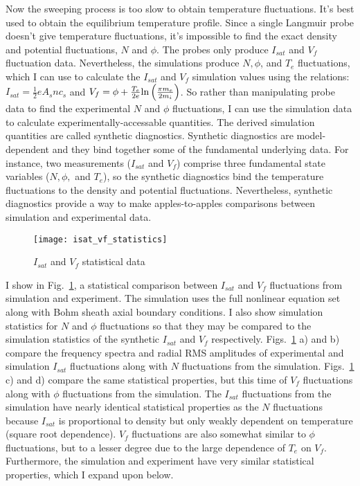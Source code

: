 Now the sweeping process is too slow to obtain temperature fluctuations. It's best used to obtain the equilibrium temperature profile. Since a single Langmuir probe doesn't give
temperature fluctuations, it's impossible to find the exact density and potential fluctuations, $N$ and $\phi$. The probes only produce $I_{sat}$ and $V_f$ fluctuation data.
Nevertheless, the simulations produce $N, \phi$, and $T_e$
fluctuations, which I can use to calculate the $I_{sat}$ and $V_f$ simulation values using the relations: $I_{sat} = \frac{1}{2} e A_s n c_s$ and
$V_f = \phi + \frac{T_e}{2 e} {\rm ln} \left(\frac{\pi m_e}{2 m_i}\right)$. So rather than manipulating probe data to find the experimental $N$ and $\phi$ fluctuations, I can
use the simulation data to calculate experimentally-accessable quantities. The derived simulation quantities are called synthetic diagnostics. 
Synthetic diagnostics are model-dependent and they bind together some of the fundamental
underlying data. For instance, two measurements ($I_{sat}$ and $V_f$) comprise three fundamental state variables ($N, \phi,$ and $T_e$), so the synthetic diagnostics bind the temperature fluctuations
to the density and potential fluctuations. Nevertheless, synthetic diagnostics provide a way to make
apples-to-apples comparisons between simulation and experimental data.


\begin{figure}[!ht]
\centerline{\texttt{[image: isat\_vf\_statistics]}}
\caption{$I_{sat}$ and $V_f$ statistical data}
\label{isat_vf_statistics}
\end{figure}

I show in Fig.~\ref{isat_vf_statistics}, a statistical comparison between $I_{sat}$ and $V_f$ fluctuations from simulation and experiment. The simulation uses the full nonlinear equation
set along with Bohm sheath axial boundary conditions. I also show simulation statistics for $N$ and $\phi$ fluctuations so that they may be compared to the simulation statistics of the synthetic
$I_{sat}$ and $V_f$ respectively. Figs.~\ref{isat_vf_statistics} a) and b) compare the frequency spectra and radial RMS amplitudes of experimental and simulation $I_{sat}$ 
fluctuations along with $N$ fluctuations from the simulation. Figs.~\ref{isat_vf_statistics} c) and d) compare the same statistical properties, but this time of $V_f$ 
fluctuations along with $\phi$ fluctuations from the simulation. The $I_{sat}$ fluctuations from the simulation have nearly identical statistical properties as the $N$ fluctuations
because $I_{sat}$ is proportional to density but only weakly dependent on temperature (square root dependence). $V_f$ fluctuations are also somewhat similar to $\phi$ fluctuations,
but to a lesser degree due to the large dependence of $T_e$ on $V_f$. Furthermore, the simulation and experiment have very similar statistical properties, which I expand upon below.

